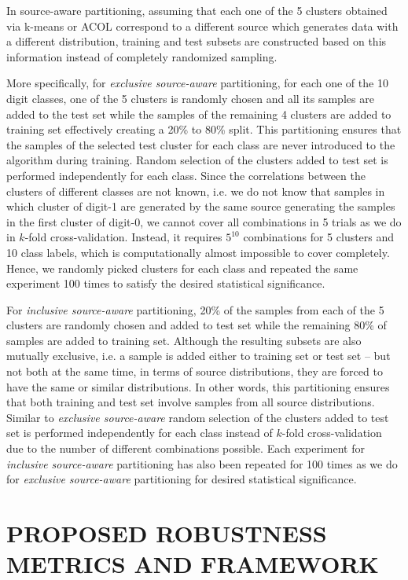 \documentclass[letterpaper]{article}
\begin{document}
In source-aware partitioning, assuming that each one of the 5 clusters obtained via k-means or ACOL correspond to a different source which generates data with a different distribution, training and test subsets are constructed based on this information instead of completely randomized sampling. 

More specifically, for \textit{exclusive source-aware} partitioning, for each one of the 10 digit classes, one of the 5 clusters is randomly chosen and all its samples are added to the test set while the samples of the remaining 4 clusters are added to training set effectively creating a 20\% to 80\% split. This partitioning ensures that the samples of the selected test cluster for each class are never introduced to the algorithm during training. Random selection of the clusters added to test set is performed independently for each class. Since the correlations between the clusters of different classes are not known, i.e. we do not know that samples in which cluster of digit-1 are generated by the same source generating the samples in the first cluster of digit-0, we cannot cover all combinations in 5 trials as we do in $k$-fold cross-validation. Instead, it requires $5^{10}$ combinations for 5 clusters and 10 class labels, which is computationally almost impossible to cover completely. Hence, we randomly picked clusters for each class and repeated the same experiment 100 times to satisfy the desired statistical significance.

For \textit{inclusive source-aware} partitioning, 20\% of the samples from each of the 5 clusters are randomly chosen and added to test set while the remaining 80\% of samples are added to training set. Although the resulting subsets are also mutually exclusive, i.e. a sample is added either to training set or test set – but not both at the same time, in terms of source distributions, they are forced to have the same or similar distributions. In other words, this partitioning ensures that both training and test set involve samples from all source distributions. Similar to \textit{exclusive source-aware} random selection of the clusters added to test set is performed independently for each class instead of $k$-fold cross-validation due to the number of different combinations possible.  Each experiment for \textit{inclusive source-aware} partitioning has also been repeated for 100 times as we do for \textit{exclusive source-aware} partitioning for desired statistical significance.

\section{PROPOSED ROBUSTNESS METRICS AND FRAMEWORK}
\end{document}
